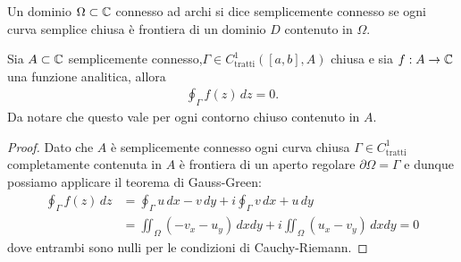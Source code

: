 \begin{definition}
  Un dominio $ \Omega \subset \mathbb{C} $ connesso ad archi si dice semplicemente connesso se ogni curva semplice chiusa è frontiera di un dominio $ D $ 
  contenuto in $ \Omega $.
\end{definition}

\begin{theorem}[ di Cauchy ] \label{thm: di Cauchy}
  Sia $ A \subset \mathbb{C} $ semplicemente connesso,$ \Gamma \in C^1_{\text{tratti}}([a,b], A) $ chiusa e sia $ f:A \to \mathbb{C} $ una funzione analitica, allora 
  \begin{align}
    \oint_\Gamma f(z) \,dz = 0.
  \end{align}
  Da notare che questo vale per ogni contorno chiuso contenuto in $ A $.
\end{theorem}
\begin{proof}
  Dato che $ A $ è semplicemente connesso ogni curva chiusa $ \Gamma \in C^1_{\text{tratti}} $ completamente contenuta in $ A $ è frontiera di un 
  aperto regolare $ \partial\Omega = \Gamma $ e dunque possiamo applicare il teorema di Gauss-Green: 
  \begin{align}
    \oint_\Gamma f(z) \,dz &= \oint_\Gamma u \,dx - v\,dy + i \oint_\Gamma v\,dx + u\,dy 
    \\
    &= \iint_\Omega (-v_x - u_y )\,dxdy + i \iint_\Omega (u_x - v_y )\,dxdy = 0
  \end{align}
  dove entrambi sono nulli per le condizioni di Cauchy-Riemann.
\end{proof}

